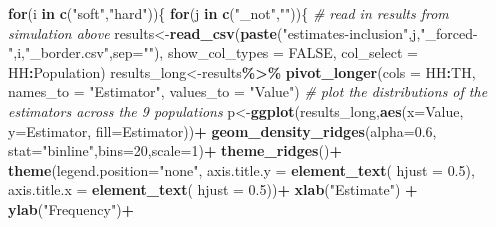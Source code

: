 \documentclass[
]{article}
\newenvironment{Shaded}{\begin{snugshade}}{\end{snugshade}}
\newcommand{\AttributeTok}[1]{\textcolor[rgb]{0.13,0.29,0.53}{#1}}
\newcommand{\CommentTok}[1]{\textcolor[rgb]{0.56,0.35,0.01}{\textit{#1}}}
\newcommand{\ConstantTok}[1]{\textcolor[rgb]{0.56,0.35,0.01}{#1}}
\newcommand{\ControlFlowTok}[1]{\textcolor[rgb]{0.13,0.29,0.53}{\textbf{#1}}}
\newcommand{\DecValTok}[1]{\textcolor[rgb]{0.00,0.00,0.81}{#1}}
\newcommand{\FloatTok}[1]{\textcolor[rgb]{0.00,0.00,0.81}{#1}}
\newcommand{\FunctionTok}[1]{\textcolor[rgb]{0.13,0.29,0.53}{\textbf{#1}}}
\newcommand{\NormalTok}[1]{#1}
\newcommand{\OtherTok}[1]{\textcolor[rgb]{0.56,0.35,0.01}{#1}}
\newcommand{\SpecialCharTok}[1]{\textcolor[rgb]{0.81,0.36,0.00}{\textbf{#1}}}
\newcommand{\StringTok}[1]{\textcolor[rgb]{0.31,0.60,0.02}{#1}}
\begin{document}
\begin{Shaded}
\begin{Highlighting}[]
\ControlFlowTok{for}\NormalTok{(i }\ControlFlowTok{in} \FunctionTok{c}\NormalTok{(}\StringTok{"soft"}\NormalTok{,}\StringTok{"hard"}\NormalTok{))\{}
  \ControlFlowTok{for}\NormalTok{(j }\ControlFlowTok{in} \FunctionTok{c}\NormalTok{(}\StringTok{"\_not"}\NormalTok{,}\StringTok{""}\NormalTok{))\{}
    \CommentTok{\# read in results from simulation above}
\NormalTok{    results}\OtherTok{\textless{}{-}}\FunctionTok{read\_csv}\NormalTok{(}\FunctionTok{paste}\NormalTok{(}\StringTok{"estimates{-}inclusion"}\NormalTok{,j,}\StringTok{"\_forced{-}"}\NormalTok{,i,}\StringTok{"\_border.csv"}\NormalTok{,}\AttributeTok{sep=}\StringTok{""}\NormalTok{),}
                      \AttributeTok{show\_col\_types =} \ConstantTok{FALSE}\NormalTok{,}
                      \AttributeTok{col\_select =}\NormalTok{ HH}\SpecialCharTok{:}\NormalTok{Population)}
\NormalTok{    results\_long}\OtherTok{\textless{}{-}}\NormalTok{results}\SpecialCharTok{\%\textgreater{}\%}
      \FunctionTok{pivot\_longer}\NormalTok{(}\AttributeTok{cols =}\NormalTok{ HH}\SpecialCharTok{:}\NormalTok{TH,}
                   \AttributeTok{names\_to =} \StringTok{"Estimator"}\NormalTok{, }
                   \AttributeTok{values\_to =} \StringTok{"Value"}\NormalTok{)}
        \CommentTok{\# plot the distributions of the estimators across the 9 populations}
\NormalTok{    p}\OtherTok{\textless{}{-}}\FunctionTok{ggplot}\NormalTok{(results\_long,}\FunctionTok{aes}\NormalTok{(}\AttributeTok{x=}\NormalTok{Value, }\AttributeTok{y=}\NormalTok{Estimator, }\AttributeTok{fill=}\NormalTok{Estimator))}\SpecialCharTok{+}
      \FunctionTok{geom\_density\_ridges}\NormalTok{(}\AttributeTok{alpha=}\FloatTok{0.6}\NormalTok{, }\AttributeTok{stat=}\StringTok{"binline"}\NormalTok{,}\AttributeTok{bins=}\DecValTok{20}\NormalTok{,}\AttributeTok{scale=}\DecValTok{1}\NormalTok{)}\SpecialCharTok{+}
      \FunctionTok{theme\_ridges}\NormalTok{()}\SpecialCharTok{+}
      \FunctionTok{theme}\NormalTok{(}\AttributeTok{legend.position=}\StringTok{"none"}\NormalTok{,}
            \AttributeTok{axis.title.y =} \FunctionTok{element\_text}\NormalTok{( }\AttributeTok{hjust =} \FloatTok{0.5}\NormalTok{),}
            \AttributeTok{axis.title.x =} \FunctionTok{element\_text}\NormalTok{( }\AttributeTok{hjust =} \FloatTok{0.5}\NormalTok{))}\SpecialCharTok{+}
      \FunctionTok{xlab}\NormalTok{(}\StringTok{"Estimate"}\NormalTok{) }\SpecialCharTok{+}
      \FunctionTok{ylab}\NormalTok{(}\StringTok{"Frequency"}\NormalTok{)}\SpecialCharTok{+}

\end{Highlighting}
\end{Shaded}
\end{document}
